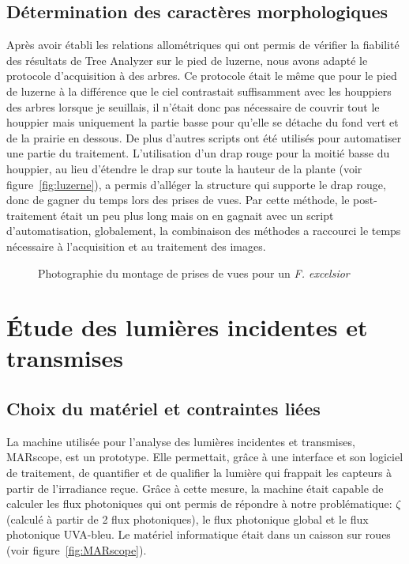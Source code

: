 \documentclass[12pt]{report}
\begin{document}
\subsection{Détermination des caractères morphologiques}

Après avoir établi les relations allométriques qui ont permis de vérifier la
fiabilité des résultats de Tree Analyzer sur le pied de luzerne, nous avons adapté le protocole
d'acquisition à des arbres. Ce protocole était le même que pour le pied de luzerne à la différence que le ciel
contrastait suffisamment avec les houppiers des arbres lorsque je seuillais, il
n'était donc pas nécessaire de couvrir tout le houppier mais uniquement la partie
basse pour qu'elle se détache du fond vert et de la prairie en dessous.
De plus d'autres scripts ont été utilisés pour automatiser une partie
du traitement. L'utilisation
d'un drap rouge pour la moitié basse du houppier, au lieu d'étendre le drap sur
toute la hauteur de la plante (voir figure~\ref{fig:luzerne}), a permis d'alléger
la structure qui supporte le drap rouge, donc de gagner
du temps lors des prises de vues. Par cette méthode, le post-traitement était un
peu plus long mais on en gagnait avec un script d'automatisation, globalement, la
combinaison des méthodes a raccourci le temps nécessaire à l'acquisition et au
traitement des images.

\begin{figure}
  \centering
  \def\svgwidth{\linewidth}
  
  \caption{Photographie du montage de prises de vues pour un \textit{F. excelsior}\label{fig:montage_finale}}
\end{figure}

\section{Étude des lumières incidentes et transmises}

\subsection{Choix du matériel et contraintes liées}


La machine utilisée pour l'analyse des lumières incidentes et transmises, MARscope,
est un prototype. Elle permettait, grâce à une interface et son logiciel
de traitement, de quantifier et de qualifier la lumière qui frappait les capteurs
à partir de l'irradiance reçue. Grâce à cette mesure, la machine était capable de
calculer les flux photoniques qui ont permis de répondre à notre problématique:
$\zeta$ (calculé à partir de 2 flux photoniques), le flux photonique
global et le flux photonique UVA-bleu. Le matériel informatique était dans un caisson sur roues
(voir figure~\ref{fig:MARscope}).
\end{document}
